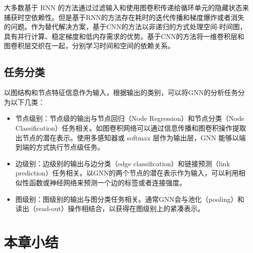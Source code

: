 大多数基于 RNN 的方法通过过滤输入和使用图卷积传递给循环单元的隐藏状态来捕获时空依赖性。但是基于RNN的方法存在耗时的迭代传播和梯度爆炸或者消失的问题。作为替代解决方案，基于CNN的方法以非递归的方式处理空间-时间图，具有并行计算、稳定梯度和低内存需求的优势。基于CNN的方法将一维卷积层和图卷积层交织在一起，分别学习时间和空间的依赖关系。

\subsection{任务分类}
以图结构和节点特征信息作为输入，根据输出的类别，可以将GNN的分析任务分为以下几类：
\begin{itemize}
\item 节点级别：节点级的输出与节点回归（Node Regression）和节点分类（Node Classification）任务相关。如图卷积网络可以通过信息传播和图卷积操作提取出节点的潜在表示。使用多感知器或 softmax 层作为输出层，GNN 能够以端到端的方式执行节点级任务。
\item 边级别：边级别的输出与边分类（edge classification）和链接预测（link prediction）任务相关。以GNN的两个节点的潜在表示作为输入，可以利用相似性函数或神经网络来预测一个边的标签或者连接强度。
\item 图级别：图级别的输出与图分类任务相关。通常GNN会与池化（pooling）和读出（read-out）操作相结合，以获得在图级别上的紧凑表示。
\end{itemize}

\section{本章小结}
